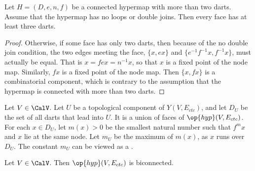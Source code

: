 \begin{lemma}\label{lemma:dj}
Let $H=(D,e,n,f)$ be a connected hypermap with more than
two darts.  Assume that the hypermap has no loops or double joins. Then
every face has at least three darts.
\end{lemma}

\begin{proof}
  Otherwise, if some face has only two darts, then because of the no
  double join condition, the two edges meeting the face, $\{x, e x\}$
  and $\{ e^{-1} f^{-1} x, f^{-1} x\}$, must actually be equal.  That
  is $ x = f e x = n^{-1} x$, so that $x$ is a fixed point of the node
  map.  Similarly, $f x$ is a fixed point of the node map.  Then $\{x,
  f x\}$ is a combinatorial component, which is contrary to the
  assumption that the hypermap is connected with more than two darts.
\end{proof}


\begin{definition}[$D_U$,~$m_U$]
  Let $V\in \CalV$.  Let $U$ be a topological component of
  $Y(V,E_{ctc})$, and let $D_U$ be the set of all darts that lead into
  $U$.  It is a union of faces of $\op{hyp}(V,E_{ctc})$.  For each
  $x\in D_U$, let $m(x) >0$ be the smallest natural number such that
  $f^{m} x$ and $x$ lie at the same node.  Let $m_U$ be the maximum of
  $m(x)$, as $x$ runs over $D_U$.  The constant $m_U$ can be viewed as
  a .  %
\end{definition}

\begin{lemma}[biconnected]\label{lemma:biconnected}
  Let $V\in \CalV$.  Then $\op{hyp}(V,E_{ctc})$ is biconnected.
\end{lemma}


